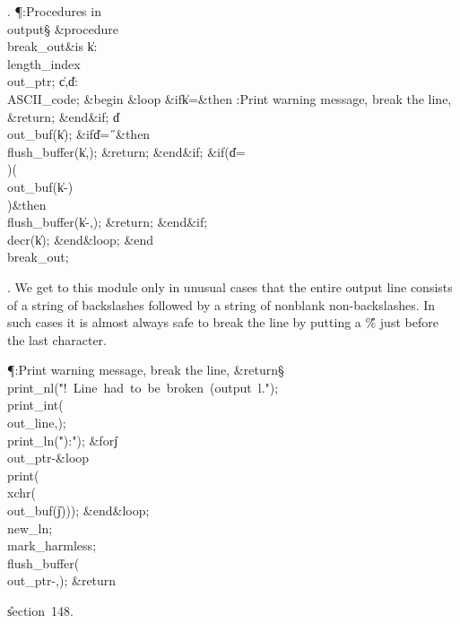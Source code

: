 . \P\?:Procedures in \\{output}\X\mathrel{+}\S\?\6
\&{procedure}\8\1\\{break\_out}\2\8\&{is}\8\1\6
\|k\?:\?\\{length\_index}\?\K\?\\{out\_ptr};\6
\|c\?,\?\|d\?:\?\\{ASCII\_code};\6
\4\&{begin}\6
\1\&{loop}\6
\&{if}\1\1\8\|k\?=\2\8\&{then}\6
:Print warning message, break the line, \&{return}\X;\2\6
\&{end}\8\2\&{if}\1;\6
\|d\?\K\?\\{out\_buf}\?\1(\?\|k\?\2)\?;\6
\&{if}\1\1\8\|d\?=\?\H{\ }\2\8\&{then}\6
\\{flush\_buffer}\?\1(\?\|k\?,\?\?\2)\?;\5
\&{return};\2\6
\&{end}\8\2\&{if}\1;\6
\&{if}\1\1\?\8\1(\?\|d\?=\?\H{\\}\?\2)\W\1(\?\\{out\_buf}\?\1(\?\|k\?-\?\2)%
\I\?\H{\\}\?\2)\?\2\8\&{then}\6
\\{flush\_buffer}\?\1(\?\|k\?-\?,\?\?\2)\?;\5
\&{return};\2\6
\&{end}\8\2\&{if}\1;\6
\\{decr}\?\1(\?\|k\?\2)\?;\2\6
\&{end}\8\&{loop};\2\6
\&{end}\8\\{break\_out};\par
\fi

. We get to this module only in unusual cases that the entire output line
consists of a string of backslashes followed by a string of nonblank
non-backslashes. In such cases it is almost always safe to break the
line by putting a \H{\%} just before the last character.

\Y\P\?\4:Print warning message, break the line, \&{return}\X\S\?\6
\\{print\_nl}\?\1(\?\.{"!\ Line\ had\ to\ be\ broken\ (output\ l."}\?\2)\?;\5
\\{print\_int}\?\1(\?\\{out\_line}\?,\?\2)\?;\5
\\{print\_ln}\?\1(\?\.{"):"}\?\2)\?;\6
\1\&{for}\8\|j\?\in{}\?\to\?\\{out\_ptr}\?-\8\&{loop}\6
\\{print}\?\1(\?\\{xchr}\?\1(\?\\{out\_buf}\?\1(\?\|j\?\2)\2)\2)\?;\2\6
\&{end}\8\&{loop};\6
\\{new\_ln};\5
\\{mark\_harmless};\5
\\{flush\_buffer}\?\1(\?\\{out\_ptr}\?-\?,\?\?\2)\?;\5
\&{return}\par
\U section~148.\fi

